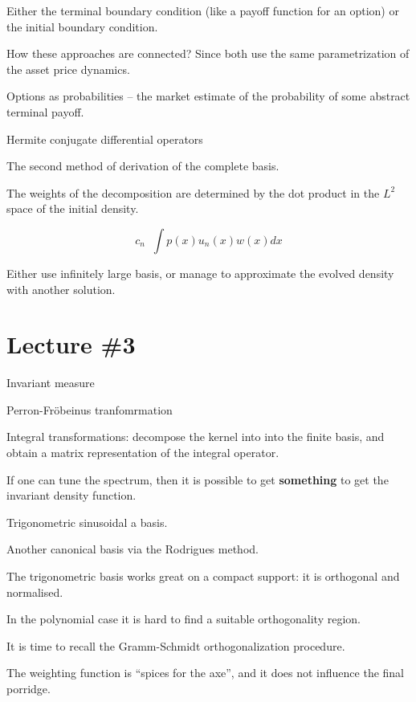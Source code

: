 \documentclass[a4paper]{article}
\newcommand{\defn}{\mathop{\overset{\Delta}{=}}\nolimits}
\begin{document}
Either the terminal boundary condition (like a payoff function for an option) or the initial boundary condition.

How these approaches are connected? Since both use the same parametrization of the asset price dynamics.

Options as probabilities -- the market estimate of the probability of some abstract terminal payoff.

Hermite conjugate differential operators

The second method of derivation of the complete basis.

The weights of the decomposition are determined by the dot product in the $L^2$ space of the initial density.

\[c_n \defn \int p(x) u_n(x) w(x) dx\]

Either use infinitely large basis, or manage to approximate the evolved density with another solution.


\section{Lecture \#3} %
\label{sec:lecture_3}

Invariant measure

Perron-Fr\"obeinus tranfomrmation

Integral transformations: decompose the kernel into into the finite basis, and obtain a matrix representation of the integral operator.

If one can tune the spectrum, then it is possible to get \textbf{something} to get the invariant density function.

Trigonometric sinusoidal a basis.

Another canonical basis via the Rodrigues method.

The trigonometric basis works great on a compact support: it is orthogonal and normalised.

In the polynomial case it is hard to find a suitable orthogonality region.

It is time to recall the Gramm-Schmidt orthogonalization procedure.


The weighting function is ``spices for the axe'', and it does not influence the final porridge.


\end{document}
